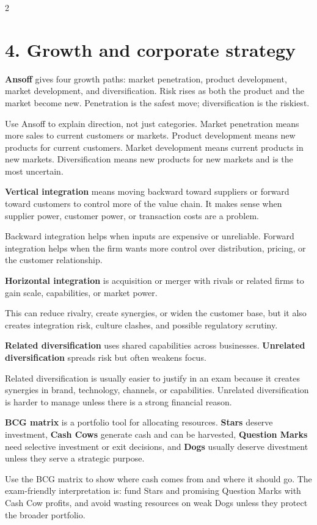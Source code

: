 \documentclass[8pt,letterpaper]{article}
\newcommand{\term}[1]{\textbf{#1}}
\begin{document}
\begin{multicols}{2}
\section*{4. Growth and corporate strategy}
\term{Ansoff} gives four growth paths: market penetration, product development, market development, and diversification. Risk rises as both the product and the market become new. Penetration is the safest move; diversification is the riskiest.

Use Ansoff to explain direction, not just categories. Market penetration means more sales to current customers or markets. Product development means new products for current customers. Market development means current products in new markets. Diversification means new products for new markets and is the most uncertain.

\term{Vertical integration} means moving backward toward suppliers or forward toward customers to control more of the value chain. It makes sense when supplier power, customer power, or transaction costs are a problem.

Backward integration helps when inputs are expensive or unreliable. Forward integration helps when the firm wants more control over distribution, pricing, or the customer relationship.

\term{Horizontal integration} is acquisition or merger with rivals or related firms to gain scale, capabilities, or market power.

This can reduce rivalry, create synergies, or widen the customer base, but it also creates integration risk, culture clashes, and possible regulatory scrutiny.

\term{Related diversification} uses shared capabilities across businesses. \term{Unrelated diversification} spreads risk but often weakens focus.

Related diversification is usually easier to justify in an exam because it creates synergies in brand, technology, channels, or capabilities. Unrelated diversification is harder to manage unless there is a strong financial reason.

\term{BCG matrix} is a portfolio tool for allocating resources. \term{Stars} deserve investment, \term{Cash Cows} generate cash and can be harvested, \term{Question Marks} need selective investment or exit decisions, and \term{Dogs} usually deserve divestment unless they serve a strategic purpose.

Use the BCG matrix to show where cash comes from and where it should go. The exam-friendly interpretation is: fund Stars and promising Question Marks with Cash Cow profits, and avoid wasting resources on weak Dogs unless they protect the broader portfolio.


\end{multicols}
\end{document}
